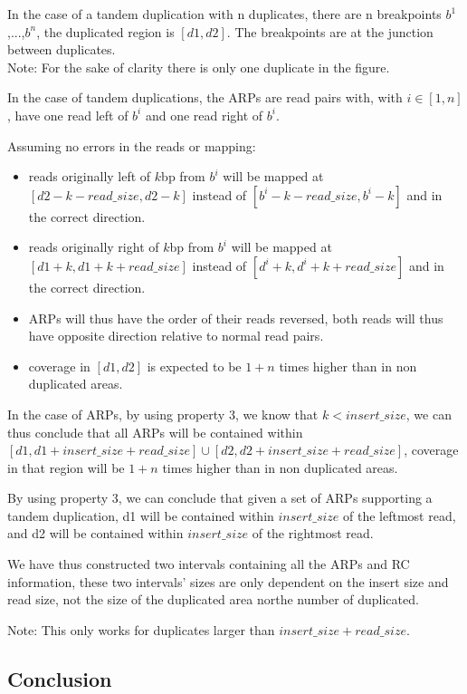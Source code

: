\documentclass{article}
\begin{document}
In the case of a tandem duplication with n duplicates, there are n breakpoints $b^1$,...,$b^n$, the duplicated region is $[d1, d2]$. The breakpoints are at the junction between duplicates.\\
Note: For the sake of clarity there is only one duplicate in the figure.

In the case of tandem duplications, the ARPs are read pairs with, with $i\in[1, n]$, have one read left of $b^i$ and one read right of $b^i$.

Assuming no errors in the reads or mapping:
\begin{itemize}
    \item reads originally left of $k$bp from $b^i$ will be mapped at $[d2 - k - read\_size, d2 - k]$ instead of $[b^i - k - read\_size, b^i - k]$ and in the correct direction.
    \item reads originally right of $k$bp from $b^i$ will be mapped at $[d1 + k, d1 + k + read\_size]$ instead of $[d^i + k, d^i + k + read\_size]$ and in the correct direction.
    \item ARPs will thus have the order of their reads reversed, both reads will thus have opposite direction relative to normal read pairs.
    \item coverage in $[d1, d2]$ is expected to be $1 + n$ times higher than in non duplicated areas.
\end{itemize}

In the case of ARPs, by using property 3, we know that $k < insert\_size$, we can thus conclude that all ARPs will be contained within $[d1, d1 + insert\_size + read\_size] \cup [d2, d2 + insert\_size + read\_size]$, coverage in that region will be $1 + n$ times higher than in non duplicated areas.

By using property 3, we can conclude that given a set of ARPs supporting a tandem duplication, d1 will be contained within $insert\_size$ of the leftmost read, and d2 will be contained within $insert\_size$ of the rightmost read.

We have thus constructed two intervals containing all the ARPs and RC information, these two intervals' sizes are only dependent on the insert size and read size, not the size of the duplicated area northe number of duplicated. 

Note: This only works for duplicates larger than $insert\_size + read\_size$.

\subsection{Conclusion}
\end{document}
